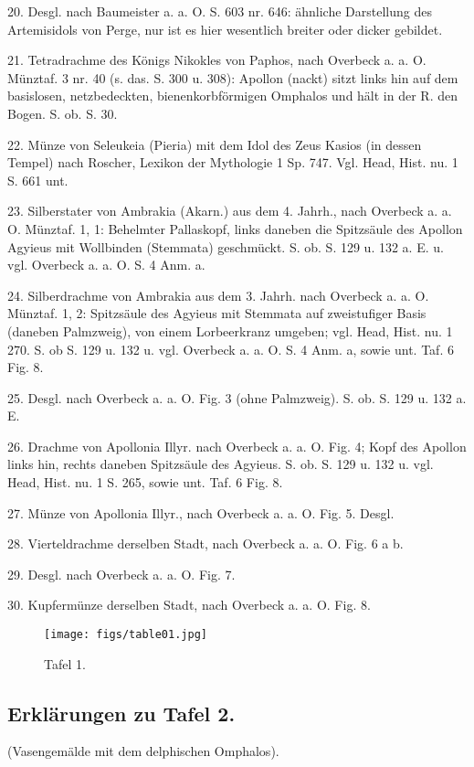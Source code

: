 \documentclass[a4paper, 11pt, oneside]{article}
\begin{document}
20. Desgl. nach Baumeister a. a. O. S. 603 nr. 646: ähnliche Darstellung des Artemisidols von Perge, nur ist es hier wesentlich breiter oder dicker gebildet.

21. Tetradrachme des Königs Nikokles von Paphos, nach Overbeck a. a. O. Münztaf. 3 nr. 40 (s. das. S. 300 u. 308): Apollon (nackt) sitzt links hin auf dem basislosen, netzbedeckten, bienenkorbförmigen Omphalos und hält in der R. den Bogen. S. ob. S. 30.

22. Münze von Seleukeia (Pieria) mit dem Idol des Zeus Kasios (in dessen Tempel) nach Roscher, Lexikon der Mythologie 1 Sp. 747. Vgl. Head, Hist. nu. 1 S. 661 unt.

23. Silberstater von Ambrakia (Akarn.) aus dem 4. Jahrh., nach Overbeck a. a. O. Münztaf. 1, 1: Behelmter Pallaskopf, links daneben die Spitzsäule des Apollon Agyieus mit Wollbinden (Stemmata) geschmückt. S. ob. S. 129 u. 132 a. E. u. vgl. Overbeck a. a. O. S. 4 Anm. a.

24. Silberdrachme von Ambrakia aus dem 3. Jahrh. nach Overbeck a. a. O. Münztaf. 1, 2: Spitzsäule des Agyieus mit Stemmata auf zweistufiger Basis (daneben Palmzweig), von einem Lorbeerkranz umgeben; vgl. Head, Hist. nu. 1 270. S. ob S. 129 u. 132 u. vgl. Overbeck a. a. O. S. 4 Anm. a, sowie unt. Taf. 6 Fig. 8.

25. Desgl. nach Overbeck a. a. O. Fig. 3 (ohne Palmzweig). S. ob. S. 129 u. 132 a. E.

26. Drachme von Apollonia Illyr. nach Overbeck a. a. O. Fig. 4; Kopf des Apollon links hin, rechts daneben Spitzsäule des Agyieus. S. ob. S. 129 u. 132 u. vgl. Head, Hist. nu. 1 S. 265, sowie unt. Taf. 6 Fig. 8.

27. Münze von Apollonia Illyr., nach Overbeck a. a. O. Fig. 5. Desgl.

28. Vierteldrachme derselben Stadt, nach Overbeck a. a. O. Fig. 6 a b.

29. Desgl. nach Overbeck a. a. O. Fig. 7.

30. Kupfermünze derselben Stadt, nach Overbeck a. a. O. Fig. 8.
\clearpage
\vspace*{\fill}
\begin{figure}[H]
\centering
\texttt{[image: figs/table01.jpg]}
\caption{\frakfamily Tafel 1.}
\end{figure}
\vspace*{\fill}
\clearpage
\subsection{Erklärungen zu Tafel 2.}
\begin{center}
(Vasengemälde mit dem delphischen Omphalos).
\end{center}
\end{document}
